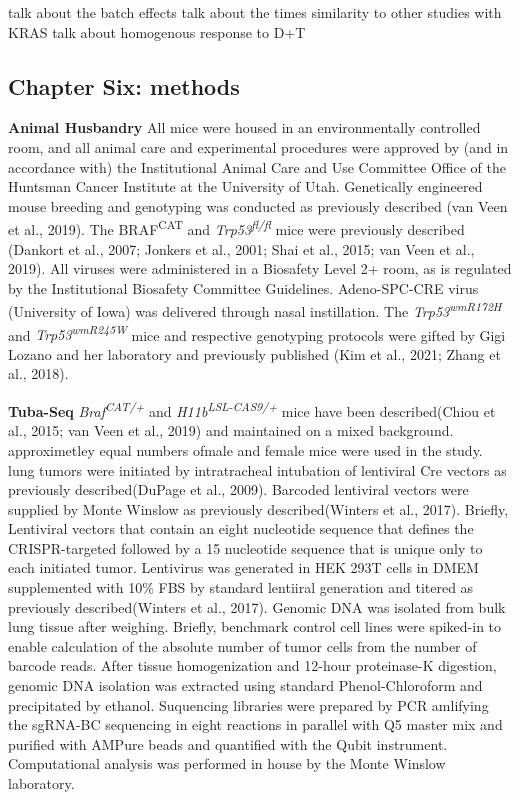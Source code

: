 talk about the batch effects
talk about the times
similarity to other studies with KRAS
talk about homogenous response to D+T

\hypertarget{chapter-six-methods}{%
\subsection{Chapter Six: methods}\label{chapter-six-methods}}

\textbf{Animal Husbandry} All mice were housed in an environmentally controlled room, and all animal care and experimental procedures were approved by (and in accordance with) the Institutional Animal Care and Use Committee Office of the Huntsman Cancer Institute at the University of Utah. Genetically engineered mouse breeding and genotyping was conducted as previously described (van Veen et al., 2019). The BRAF\textsuperscript{CAT} and \emph{Trp53\textsuperscript{fl/fl}} mice were previously described (Dankort et al., 2007; Jonkers et al., 2001; Shai et al., 2015; van Veen et al., 2019). All viruses were administered in a Biosafety Level 2+ room, as is regulated by the Institutional Biosafety Committee Guidelines. Adeno-SPC-CRE virus (University of Iowa) was delivered through nasal instillation. The \emph{Trp53\textsuperscript{wmR172H}} and \emph{Trp53\textsuperscript{wmR245W}} mice and respective genotyping protocols were gifted by Gigi Lozano and her laboratory and previously published (Kim et al., 2021; Zhang et al., 2018).

\textbf{Tuba-Seq} \emph{Braf\textsuperscript{CAT/+}} and \emph{H11b\textsuperscript{LSL-CAS9/+}} mice have been described(Chiou et al., 2015; van Veen et al., 2019) and maintained on a mixed background. approximetley equal numbers ofmale and female mice were used in the study. lung tumors were initiated by intratracheal intubation of lentiviral Cre vectors as previously described(DuPage et al., 2009). Barcoded lentiviral vectors were supplied by Monte Winslow as previously described(Winters et al., 2017). Briefly, Lentiviral vectors that contain an eight nucleotide sequence that defines the CRISPR-targeted followed by a 15 nucleotide sequence that is unique only to each initiated tumor. Lentivirus was generated in HEK 293T cells in DMEM supplemented with 10\% FBS by standard lentiiral generation and titered as previously described(Winters et al., 2017). Genomic DNA was isolated from bulk lung tissue after weighing. Briefly, benchmark control cell lines were spiked-in to enable calculation of the absolute number of tumor cells from the number of barcode reads. After tissue homogenization and 12-hour proteinase-K digestion, genomic DNA isolation was extracted using standard Phenol-Chloroform and precipitated by ethanol. Suquencing libraries were prepared by PCR amlifying the sgRNA-BC sequencing in eight reactions in parallel with Q5 master mix and purified with AMPure beads and quantified with the Qubit instrument. Computational analysis was performed in house by the Monte Winslow laboratory.

